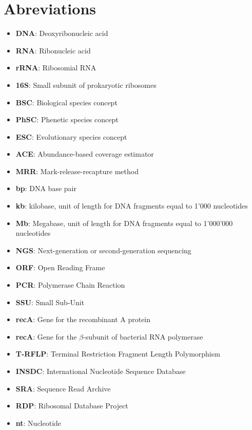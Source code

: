 \logvartrue
\chapter{Abreviations}

\begin{itemize}
\item \textbf{DNA}: Deoxyribonucleic acid
\item \textbf{RNA}: Ribonucleic acid
\item \textbf{rRNA}: Ribosomial RNA
\item \textbf{16S}: Small subunit of prokaryotic ribosomes
\item \textbf{BSC}: Biological species concept
\item \textbf{PhSC}: Phenetic species concept
\item \textbf{ESC}: Evolutionary species concept
\item \textbf{ACE}: Abundance-based coverage estimator
\item \textbf{MRR}: Mark-release-recapture method
\item \textbf{bp}: DNA base pair
\item \textbf{kb}: kilobase, unit of length for DNA fragments equal to 1'000 nucleotides
\item \textbf{Mb}: Megabase, unit of length for DNA fragments equal to 1'000'000 nucleotides
\item \textbf{NGS}: Next-generation or second-generation sequencing
\item \textbf{ORF}: Open Reading Frame
\item \textbf{PCR}: Polymerase Chain Reaction
\item \textbf{SSU}: Small Sub-Unit
\item \textbf{recA}: Gene for the recombinant A protein
\item \textbf{recA}: Gene for the $\beta$-subunit of bacterial RNA polymerase
\item \textbf{T-RFLP}: Terminal Restriction Fragment Length Polymorphism
\item \textbf{INSDC}: International Nucleotide Sequence Database
\item \textbf{SRA}: Sequence Read Archive
\item \textbf{RDP}: Ribosomal Database Project
\item \textbf{nt}: Nucleotide


\end{itemize}
